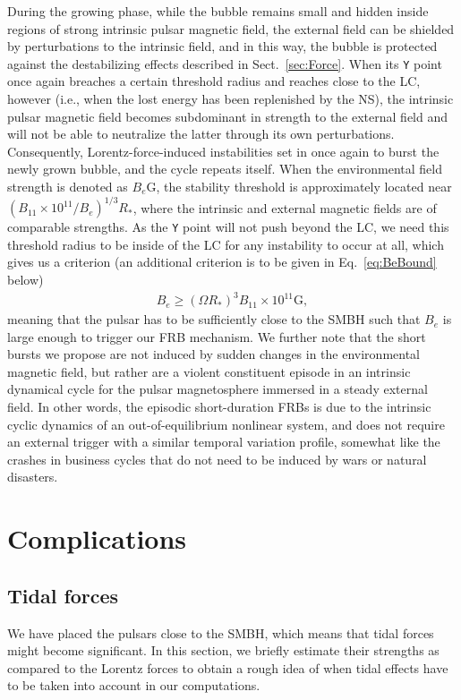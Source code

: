 \documentclass{aa}
\newcommand{\bea}{\begin{eqnarray}}
\newcommand{\eea}{\end{eqnarray}}
\begin{document}
During the growing phase, while the bubble remains small and hidden inside regions of strong intrinsic pulsar magnetic field, the external field can be shielded by perturbations to the intrinsic field, and in this way, the bubble is protected against the destabilizing effects described in Sect.~\ref{sec:Force}. When its \verb!Y! point once again breaches a certain threshold radius and reaches close to the LC, however (i.e., when the lost energy has been replenished by the NS), the intrinsic pulsar magnetic field becomes subdominant in strength to the external field and will not be able to neutralize the latter through its own perturbations. Consequently, Lorentz-force-induced instabilities set in once again to burst the newly grown bubble, and the cycle repeats itself. When the environmental field strength is denoted as $B_{e}$G, the stability threshold is approximately located near $(B_{11}\times 10^{11}/B_e)^{1/3}R_*$, where the intrinsic and external magnetic fields are of comparable strengths. As the \verb!Y! point will not push beyond the LC, we need this threshold radius to be inside of the LC for any instability to occur at all, which gives us a criterion (an additional criterion is to be given in Eq.~\eqref{eq:BeBound} below)
\bea \label{eq:BeBound1}
B_e \geq (\Omega R_*)^3 B_{11}\times 10^{11} \text{G},
\eea 
meaning that the pulsar has to be sufficiently close to the SMBH such that $B_e$ is large enough to trigger our FRB mechanism. We further note that the short bursts we propose are not induced by sudden changes in the environmental magnetic field, but rather are a violent constituent episode in an intrinsic dynamical cycle for the pulsar magnetosphere immersed in a steady external field. In other words, the episodic short-duration FRBs is due to the intrinsic cyclic dynamics of an out-of-equilibrium nonlinear system, and does not require an external trigger with a similar temporal variation profile, somewhat like the crashes in business cycles that do not need to be induced by wars or natural disasters. 

\section{Complications} \label{sec:complications}
\subsection{Tidal forces} \label{sec:tidal}
We have placed the pulsars close to the SMBH, which means that tidal forces might become significant. In this section, we briefly estimate their strengths as compared to the Lorentz forces to obtain a rough idea of when tidal effects have to be taken into account in our computations.
\end{document}
